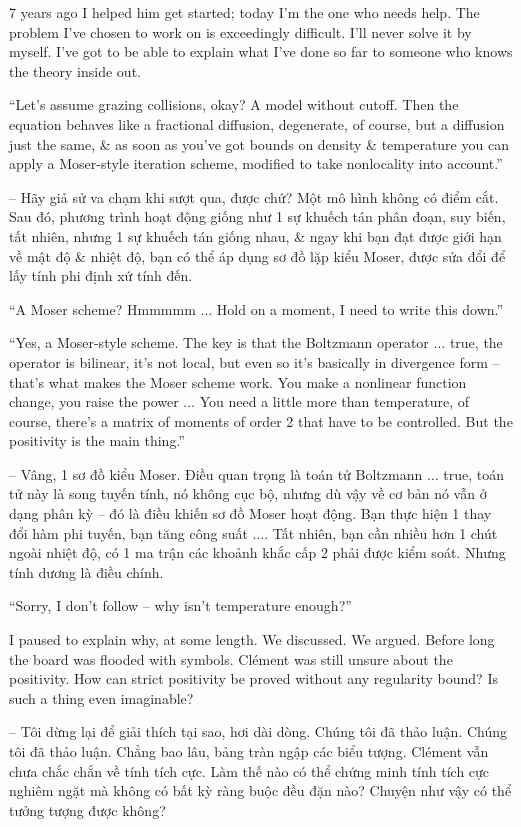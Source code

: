 \documentclass{article}
\begin{document}
\begin{enumerate}
	7 years ago I helped him get started; today I'm the one who needs help. The problem I've chosen to work on is exceedingly difficult. I'll never solve it by myself. I've got to be able to explain what I've done so far to someone who knows the theory inside out.

	``Let's assume grazing collisions, okay? A model without cutoff. Then the equation behaves like a fractional diffusion, degenerate, of course, but a diffusion just the same, \& as soon as you've got bounds on density \& temperature you can apply a Moser-style iteration scheme, modified to take nonlocality into account.''

	-- Hãy giả sử va chạm khi sượt qua, được chứ? Một mô hình không có điểm cắt. Sau đó, phương trình hoạt động giống như 1 sự khuếch tán phân đoạn, suy biến, tất nhiên, nhưng 1 sự khuếch tán giống nhau, \& ngay khi bạn đạt được giới hạn về mật độ \& nhiệt độ, bạn có thể áp dụng sơ đồ lặp kiểu Moser, được sửa đổi để lấy tính phi định xứ tính đến.

	``A Moser scheme? Hmmmmm $\ldots$ Hold on a moment, I need to write this down.''

	``Yes, a Moser-style scheme. The key is that the Boltzmann operator $\ldots$ true, the operator is bilinear, it's not local, but even so it's basically in divergence form -- that's what makes the Moser scheme work. You make a nonlinear function change, you raise the power $\ldots$ You need a little more than temperature, of course, there's a matrix of moments of order 2 that have to be controlled. But the positivity is the main thing.''

	-- Vâng, 1 sơ đồ kiểu Moser. Điều quan trọng là toán tử Boltzmann $\ldots$ true, toán tử này là song tuyến tính, nó không cục bộ, nhưng dù vậy về cơ bản nó vẫn ở dạng phân kỳ -- đó là điều khiến sơ đồ Moser hoạt động. Bạn thực hiện 1 thay đổi hàm phi tuyến, bạn tăng công suất $\ldots$. Tất nhiên, bạn cần nhiều hơn 1 chút ngoài nhiệt độ, có 1 ma trận các khoảnh khắc cấp 2 phải được kiểm soát. Nhưng tính dương là điều chính.

	``Sorry, I don't follow -- why isn't temperature enough?''

	I paused to explain why, at some length. We discussed. We argued. Before long the board was flooded with symbols. Cl\'ement was still unsure about the positivity. How can strict positivity be proved without any regularity bound? Is such a thing even imaginable?

	-- Tôi dừng lại để giải thích tại sao, hơi dài dòng. Chúng tôi đã thảo luận. Chúng tôi đã thảo luận. Chẳng bao lâu, bảng tràn ngập các biểu tượng. Cl\'ement vẫn chưa chắc chắn về tính tích cực. Làm thế nào có thể chứng minh tính tích cực nghiêm ngặt mà không có bất kỳ ràng buộc đều đặn nào? Chuyện như vậy có thể tưởng tượng được không?


\end{enumerate}
\end{document}

